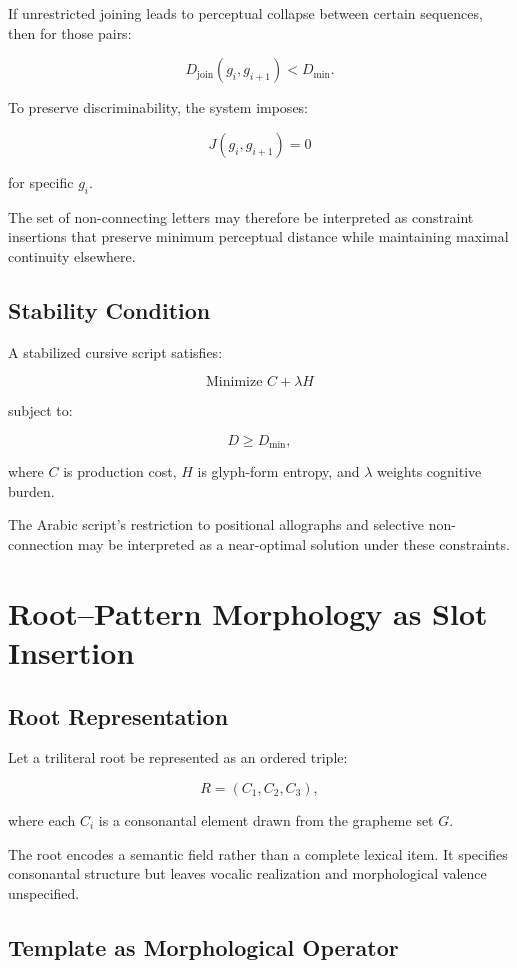 \documentclass[11pt]{article}
\begin{document}
If unrestricted joining leads to perceptual collapse between certain sequences, then for those pairs:

\[
D_{\text{join}}(g_i, g_{i+1}) < D_{\text{min}}.
\]

To preserve discriminability, the system imposes:

\[
J(g_i, g_{i+1}) = 0
\]

for specific $g_i$.

The set of non-connecting letters may therefore be interpreted as constraint insertions that preserve minimum perceptual distance while maintaining maximal continuity elsewhere.

\subsection{Stability Condition}

A stabilized cursive script satisfies:

\[
\text{Minimize } C + \lambda H
\]

subject to:

\[
D \geq D_{\text{min}},
\]

where $C$ is production cost, $H$ is glyph-form entropy, and $\lambda$ weights cognitive burden.

The Arabic script's restriction to positional allographs and selective non-connection may be interpreted as a near-optimal solution under these constraints.

\section{Root–Pattern Morphology as Slot Insertion}

\subsection{Root Representation}

Let a triliteral root be represented as an ordered triple:

\[
R = (C_1, C_2, C_3),
\]

where each $C_i$ is a consonantal element drawn from the grapheme set $G$.

The root encodes a semantic field rather than a complete lexical item. It specifies consonantal structure but leaves vocalic realization and morphological valence unspecified.

\subsection{Template as Morphological Operator}
\end{document}
